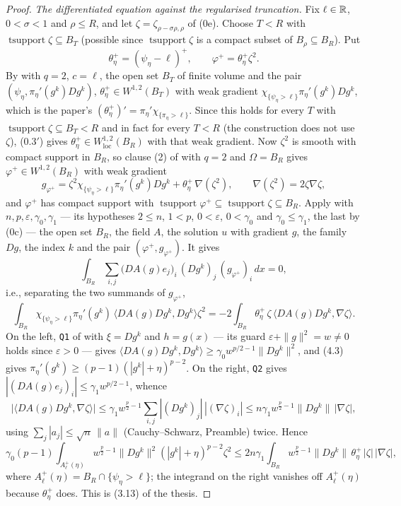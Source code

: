 \begin{proof}
\emph{The differentiated equation against the regularised truncation.}  Fix
$\ell\in\mathbb{R}$, $0<\sigma<1$ and $\rho\le R$, and let
$\zeta=\zeta_{\rho-\sigma\rho,\rho}$ of (0e).  Choose $T<R$ with
$\operatorname{tsupport}\zeta\subseteq B_T$ (possible since
$\operatorname{tsupport}\zeta$ is a compact subset of $B_\rho\subseteq B_R$).
Put
\[
\theta^+_\eta=(\psi_\eta-\ell)^+,\qquad \varphi^+=\theta^+_\eta\zeta^2 .
\]
By  with $q=2$, $c=\ell$, the open set $B_T$
of finite volume and the pair $(\psi_\eta,\pi_\eta'(g^k)Dg^k)$,
$\theta^+_\eta\in W^{1,2}(B_T)$ with weak gradient
$\chi_{\{\psi_\eta>\ell\}}\pi_\eta'(g^k)Dg^k$, which is the paper's
$(\theta^+_\eta)'=\pi_\eta'\chi_{\{\pi_\eta>\ell\}}$.  Since this holds for every
$T$ with $\operatorname{tsupport}\zeta\subseteq B_T<R$ and in fact for every
$T<R$ (the construction does not use $\zeta$), (0.3$'$) gives
$\theta^+_\eta\in W^{1,2}_{\mathrm{loc}}(B_R)$ with that weak gradient.  Now
$\zeta^2$ is smooth with compact support in $B_R$, so clause (2) of
 with $q=2$ and $\Omega=B_R$ gives
$\varphi^+\in W^{1,2}(B_R)$ with weak gradient
\[
g_{\varphi^+}=\zeta^2\chi_{\{\psi_\eta>\ell\}}\pi_\eta'(g^k)Dg^k
+\theta^+_\eta\,\nabla(\zeta^2),
\qquad \nabla(\zeta^2)=2\zeta\nabla\zeta ,
\]
and $\varphi^+$ has compact support with
$\operatorname{tsupport}\varphi^+\subseteq\operatorname{tsupport}\zeta\subseteq
B_R$.  Apply  with
$n,p,\varepsilon,\gamma_0,\gamma_1$ --- its hypotheses $2\le n$, $1<p$,
$0<\varepsilon$, $0<\gamma_0$ and $\gamma_0\le\gamma_1$, the last by (0c) ---
the open set $B_R$, the field $A$, the solution $u$ with gradient $g$, the
family $Dg$, the index $k$ and the pair $(\varphi^+,g_{\varphi^+})$.  It gives
\[
\int_{B_R}\sum_{i,j}\bigl(DA(g)e_j\bigr)_i\,(Dg^k)_j\,(g_{\varphi^+})_i\,dx=0 ,
\]
i.e., separating the two summands of $g_{\varphi^+}$,
\[
\int_{B_R}\chi_{\{\psi_\eta>\ell\}}\pi_\eta'(g^k)\,
\bigl\langle DA(g)Dg^k,Dg^k\bigr\rangle\zeta^2
=-2\int_{B_R}\theta^+_\eta\,\zeta\,\bigl\langle DA(g)Dg^k,\nabla\zeta\bigr\rangle .
\]
On the left, \texttt{Q1} of  with $\xi=Dg^k$ and
$h=g(x)$ --- its guard $\varepsilon+\|g\|^2=w\ne0$ holds since
$\varepsilon>0$ --- gives $\langle DA(g)Dg^k,Dg^k\rangle\ge\gamma_0
w^{p/2-1}\|Dg^k\|^2$, and (4.3) gives
$\pi_\eta'(g^k)\ge(p-1)(|g^k|+\eta)^{p-2}$.  On the right, \texttt{Q2} gives
$|(DA(g)e_j)_i|\le\gamma_1w^{p/2-1}$, whence
\[
\bigl|\langle DA(g)Dg^k,\nabla\zeta\rangle\bigr|
\le\gamma_1w^{\frac p2-1}\sum_{i,j}|(Dg^k)_j|\,|(\nabla\zeta)_i|
\le n\gamma_1w^{\frac p2-1}\|Dg^k\|\,|\nabla\zeta| ,
\]
using $\sum_j|a_j|\le\sqrt n\,\|a\|$ (Cauchy--Schwarz, Preamble) twice.  Hence
\[
\gamma_0(p-1)\!\!\int_{A^+_{\ell}(\eta)}\!\!w^{\frac p2-1}\|Dg^k\|^2(|g^k|+\eta)^{p-2}\zeta^2
\le2n\gamma_1\!\!\int_{B_R}\!\!w^{\frac p2-1}\|Dg^k\|\,\theta^+_\eta\,|\zeta|\,|\nabla\zeta| ,
\tag{3.13$^+$}
\]
where $A^+_{\ell}(\eta)=B_R\cap\{\psi_\eta>\ell\}$; the integrand on the right
vanishes off $A^+_\ell(\eta)$ because $\theta^+_\eta$ does.  This is
(3.13) of the thesis.


\end{proof}
